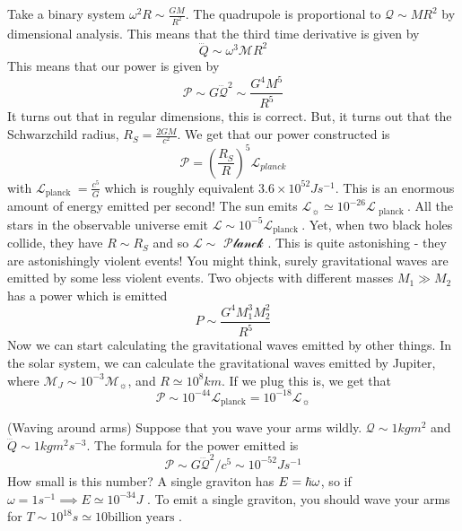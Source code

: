 \begin{example}
	Take a binary system $ \omega ^ 2 R \sim \frac{ G M }{ R ^ 2  }$. 
	The quadrupole 
	is proportional to $ \mathcal{  Q} \sim M R ^ 2 $
	by dimensional analysis. This means that 
	the third time derivative is given by 
	\[
		\dddot{Q} \sim \omega ^ 3 \mathcal{ M } R ^ 2 
	\]  This means that our power is given by 
	\[
		\mathcal{ P } \sim G  \dddot{\mathcal{ Q}} ^ 2 \sim 
		\frac{ G ^ 4 M ^ 5 }{ R ^ 5 } 
	\] It turns out that in regular dimensions, 
	this is correct. But, it turns out that the 
	Schwarzchild radius, $ R _ S = \frac{ 2 G M }{ c ^ 2 } $. 
	We get that our power constructed is 
	\[
		\mathcal{ P }  = \left( \frac{ R _ S}{ R }  \right)  ^{ 5 } 
		\mathcal{ L } _{ planck}
	\] with $ \mathcal{ L } _{ \text{planck  } }  = \frac{ c ^ 5 }{ G } $ which is roughly equivalent $ 3. 6   \times 10 ^{ 52 } J s ^{ - 1} $.  
	This is an enormous amount of energy emitted per second! 
	The sun emits $ \mathcal{ L } _{ \sun  } \simeq 10 ^{ - 26 } \mathcal{ L } _{ \text{ planck } }  $. All the stars in the 
	observable universe emit $ \mathcal{ L } \sim 10 ^{  - 5 } \mathcal{ L } _{ \text{planck } } $. Yet, when two black holes 
	collide, they have $ R \sim R _ S $ and so $ \mathcal{ L } \sim \mathcal{ \text{ Planck }}$. This is quite astonishing  -
	they are astonishingly violent events! You might think, 
	surely gravitational waves are emitted by some less violent 
	events. 
	Two objects with different masses $ M _ 1 \gg M _ 2 $ 
	has a power which is emitted 
	\[
	 P \sim \frac{ G ^  4 M _   1 ^ 3 M _ 2 ^ 2 }{ R ^ 5 }
	\] Now we can start calculating the gravitational 
	waves emitted by other things. 
	In the solar system, we can calculate the gravitational 
	waves emitted by Jupiter, where $ \mathcal{ M } _{ J }  \sim 
	10 ^{ - 3 } \mathcal{ M } _{ \sun } $, and $ R \simeq 10 ^{ 8 } km $. 
	If we plug this is, we get that 
	\[
	 \mathcal{ P } \sim 10 ^{ - 44 } \mathcal{ L }_{ \text{planck} } 
	  = 10 ^{ - 18 } \mathcal{ L } _{ \sun }
  \] 
\end{example}
\begin{example}{(Waving around arms)}
	Suppose that you wave your arms wildly. 
	$ \mathcal{ Q } \sim 1 kg m ^ 2 $ and 
	$ \dddot{Q} \sim 1 kg m ^ 2 s ^{ - 3 } $. 
	The formula for the power emitted is 
	\[
		\mathcal{ P } \sim G \dddot{\mathcal{ Q } }^ 2 / c ^ 5 \sim 10^{ - 5 2 } J s ^{ - 1 } 
	\]  How small is this number? A single 
	graviton has $ E  = \hbar \omega 	 $, so if $ \omega  = 1 s ^{ - 1 } \implies E \simeq 10 ^{ - 3 4} J $ . To emit a single graviton, you 
	should wave your arms for 
	$ T \sim 10 ^{ 18 } s \simeq 10 \text{billion years } $.
\end{example}
